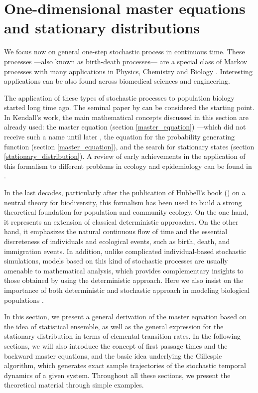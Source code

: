 \section{One-dimensional master equations\\ and stationary distributions}
\label{MEq_Approach}
We focus now on general one-step stochastic process in continuous time. These processes ---also known as birth-death processes--- are a special class of Markov processes with many applications in Physics, Chemistry and Biology \citep{vanKampen92}. Interesting applications can be also found across biomedical sciences and engineering. 
\smallskip

The application of these types of stochastic processes to population biology started long time ago. The seminal paper by \citet{Kendall1948Logseries} can be considered the starting point. In Kendall's work, the main mathematical concepts discussed in this section are already used: the master equation (section \ref{master_equation}) ---which did not receive such a name until later \citep{vanKampen92}, the equation for the probability generating function (section \ref{master_equation}), and the search for stationary states (section \ref{stationary_distribution}). A review of early achievements in the application of this formalism to different problems in ecology and epidemiology can be found in \citet{Barlett60}.
\smallskip

In the last decades, particularly after the publication of Hubbell's book (\citeyear{Hubbell01}) on a neutral theory for biodiversity, this formalism has been used to build a strong theoretical foundation for population and community ecology. On the one hand, it represents an extension of classical deterministic approaches. On the other hand, it emphasizes the natural continuous flow of time and the essential discreteness of individuals and ecological events, such as birth, death, and immigration events. In addition, unlike complicated individual-based stochastic simulations, models based on this kind of stochastic processes are usually amenable to mathematical analysis, which provides complementary insights to those obtained by using the deterministic approach. Here we also insist on the importance of both deterministic and stochastic approach in modeling biological populations \citep{Nisbet82,Renshaw91}. 
\smallskip

In this section, we present a general derivation of the master equation based on the idea of statistical ensemble, as well as the general expression for the stationary distribution in terms of elemental transition rates. In the following sections, we will also introduce the concept of first passage times and the backward master equations, and the basic idea underlying the Gillespie algorithm, which generates exact sample trajectories of the stochastic temporal dynamics of a given system. Throughout all these sections, we present the theoretical material through simple examples.

